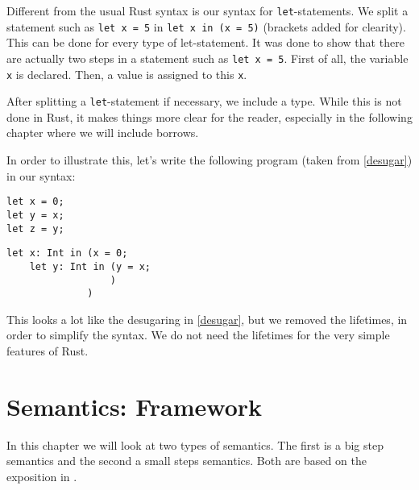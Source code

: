 Different from the usual Rust syntax is our syntax for \texttt{let}-statements. We split a statement such as \verb|let x = 5| in \texttt{let x in (x = 5)} (brackets added for clearity). This can be done for every type of let-statement. It was done to show that there are actually two steps in a statement such as \texttt{let x = 5}. First of all, the variable \verb|x| is declared. Then, a value is assigned to this \verb|x|. 

After splitting a \texttt{let}-statement if necessary, we include a type. While this is not done in Rust, it makes things more clear for the reader, especially in the following chapter where we will include borrows. 

In order to illustrate this, let's write the following program (taken from \ref{desugar}) in our syntax: 

\begin{verbatim}
let x = 0;
let y = x;
let z = y;
\end{verbatim}

\begin{verbatim}
let x: Int in (x = 0;
    let y: Int in (y = x;
                  )
              )
\end{verbatim}

This looks a lot like the desugaring in \ref{desugar}, but we removed the lifetimes, in order to simplify the syntax. We do not need the lifetimes for the very simple features of Rust. 


\section{Semantics: Framework}
In this chapter we will look at two types of semantics. The first is a big step semantics and the second a small steps semantics. Both are based on the exposition in \cite{nielson1992semantics}. 

